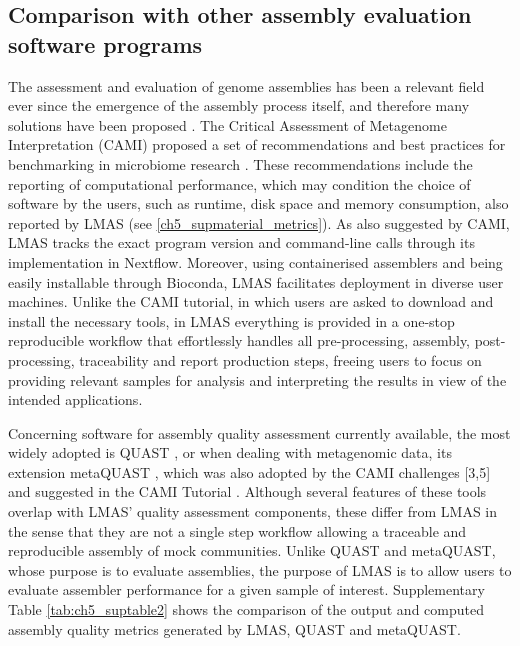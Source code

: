 \subsection{Comparison with other assembly evaluation software programs}

The assessment and evaluation of genome assemblies has been a relevant field ever since the emergence of the assembly process itself, and therefore many solutions have been proposed \cite{sczyrba_critical_2017, olson_metagenomic_2019, bradnam_assemblathon_2013, gurevich_quast_2013, mikheenko_metaquast_2016, manchanda_genomeqc_2020, meader_genome_2010, challis_blobtoolkit_2020}. The Critical Assessment of Metagenome Interpretation (CAMI) proposed a set of recommendations and best practices for benchmarking in microbiome research \cite{meyer_tutorial_2021}. These recommendations include the reporting of computational performance, which may condition the choice of software by the users, such as runtime, disk space and memory consumption, also reported by  LMAS (see \ref{ch5_supmaterial_metrics}). As also suggested by CAMI, LMAS tracks the exact program version and command-line calls through its implementation in Nextflow. Moreover,  using containerised assemblers and being easily installable through Bioconda, LMAS facilitates deployment in diverse user machines. Unlike the CAMI tutorial, in which users are asked to download and install the necessary tools, in LMAS everything is provided in a one-stop reproducible workflow that effortlessly handles all pre-processing, assembly, post-processing, traceability and report production steps, freeing users to focus on providing relevant samples for analysis and interpreting the results in view of the intended applications.

Concerning software for assembly quality assessment currently available, the most widely adopted is QUAST \cite{gurevich_quast_2013}, or when dealing with metagenomic data, its extension metaQUAST \cite{mikheenko_metaquast_2016}, which was also adopted by the CAMI challenges [3,5] \cite{sczyrba_critical_2017, meyer_critical_2021} and suggested in the CAMI Tutorial \cite{meyer_tutorial_2021}. Although several features of these tools overlap with LMAS’ quality assessment components, these differ from LMAS in the sense that they are not a single step workflow allowing a traceable and reproducible assembly of mock communities. Unlike QUAST and metaQUAST, whose purpose is to evaluate assemblies, the purpose of LMAS is to allow users to evaluate assembler performance for a given sample of interest. Supplementary Table \ref{tab:ch5_suptable2} shows the comparison of the output and computed assembly quality metrics generated by LMAS, QUAST and metaQUAST. 

